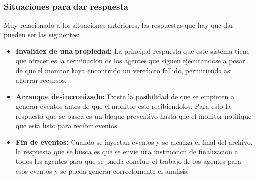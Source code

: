 \documentclass[12pt, letterpaper]{article}
\begin{document}
 \subsubsection{Situaciones para dar respuesta}
  Muy relacionado a los situaciones anteriores, las respuestas que hay que dar pueden ser las siguientes:
  \begin{itemize}
    \item \textbf{Invalidez de una propiedad: }La principal respuesta que este sistema tiene que ofrecer es la terminacion de los agentes que siguen ejecutandose a pesar de que el monitor haya encontrado un veredicto fallido, permitiendo asi ahorrar recursos.
    \item \textbf{Arranque desincronizado: }Existe la posibilidad de que se empiecen a generar eventos antes de que el monitor este recibiendolos. Para esto la respuesta que se busca es un bloque preventivo hasta que el monitor notifique que esta listo para recibir eventos.
    \item \textbf{Fin de eventos: }Cuando se inyectan eventos y se alcanza el final del archivo, la respuesta que se busca es que se envie una instruccion de finalizacion a todos los agentes para que se pueda concluir el trabajo de los agentes para esos eventos y se pueda generar correctamente el analisis. 
  \end{itemize}
\end{document}
